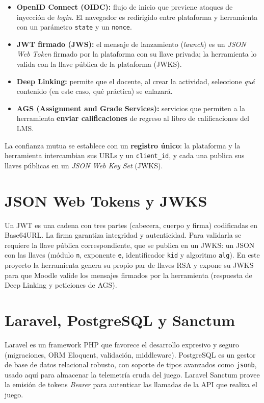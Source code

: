 \documentclass[12pt,letterpaper,oneside]{report}
\begin{document}
\begin{itemize}[leftmargin=1.4em]
  \item \textbf{OpenID Connect (OIDC):} flujo de inicio que previene ataques de
  inyección de \emph{login}. El navegador es redirigido entre plataforma y
  herramienta con un parámetro \texttt{state} y un \texttt{nonce}.
  \item \textbf{JWT firmado (JWS):} el mensaje de lanzamiento (\emph{launch}) es
  un \emph{JSON Web Token} firmado por la plataforma con su llave privada; la
  herramienta lo valida con la llave pública de la plataforma (JWKS).
  \item \textbf{Deep Linking:} permite que el docente, al crear la actividad,
  seleccione \emph{qué} contenido (en este caso, qué práctica) se enlazará.
  \item \textbf{AGS (Assignment and Grade Services):} servicios que permiten a la
  herramienta \textbf{enviar calificaciones} de regreso al libro de
  calificaciones del LMS.
\end{itemize}

La confianza mutua se establece con un \textbf{registro único}: la plataforma y
la herramienta intercambian sus URLs y un \texttt{client\_id}, y cada una publica
sus llaves públicas en un \emph{JSON Web Key Set} (JWKS).

\section{JSON Web Tokens y JWKS}
Un JWT es una cadena con tres partes (cabecera, cuerpo y firma) codificadas en
Base64URL. La firma garantiza integridad y autenticidad. Para validarla se
requiere la llave pública correspondiente, que se publica en un JWKS: un JSON con
las llaves (módulo \texttt{n}, exponente \texttt{e}, identificador \texttt{kid} y
algoritmo \texttt{alg}). En este proyecto la herramienta genera su propio par de
llaves RSA y expone su JWKS para que Moodle valide los mensajes firmados por la
herramienta (respuesta de Deep Linking y peticiones de AGS).

\section{Laravel, PostgreSQL y Sanctum}
Laravel es un framework PHP que favorece el desarrollo expresivo y seguro
(migraciones, ORM Eloquent, validación, middleware). PostgreSQL es un gestor de
base de datos relacional robusto, con soporte de tipos avanzados como
\texttt{jsonb}, usado aquí para almacenar la telemetría cruda del juego. Laravel
Sanctum provee la emisión de tokens \emph{Bearer} para autenticar las llamadas
de la API que realiza el juego.
\end{document}
